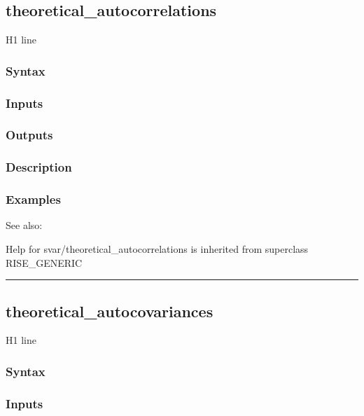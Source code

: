 \documentclass[letterpaper,10pt,english]{sphinxmanual}
\begin{document}
\subsection{theoretical\_autocorrelations}
\label{classes/models/@svar/svar:theoretical-autocorrelations}\label{classes/models/@svar/svar:id137}
H1 line


\subsubsection{Syntax}
\label{classes/models/@svar/svar:id138}

\subsubsection{Inputs}
\label{classes/models/@svar/svar:id139}

\subsubsection{Outputs}
\label{classes/models/@svar/svar:id140}

\subsubsection{Description}
\label{classes/models/@svar/svar:id141}

\subsubsection{Examples}
\label{classes/models/@svar/svar:id142}
See also:

Help for svar/theoretical\_autocorrelations is inherited from superclass RISE\_GENERIC


\bigskip\hrule{}\bigskip



\subsection{theoretical\_autocovariances}
\label{classes/models/@svar/svar:theoretical-autocovariances}\label{classes/models/@svar/svar:id143}
H1 line


\subsubsection{Syntax}
\label{classes/models/@svar/svar:id144}

\subsubsection{Inputs}
\label{classes/models/@svar/svar:id145}
\end{document}
